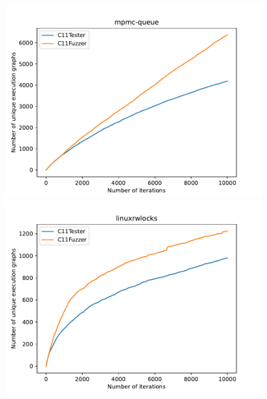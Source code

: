 \begin{figure}[H]
    \vspace{0.5cm}

    \begin{minipage}{0.45\textwidth}
        \centering
        \includegraphics[width=\textwidth]{figure/mpmc-queue.pdf}
    \end{minipage}
    \hfill
    \begin{minipage}{0.45\textwidth}
        \centering
        \includegraphics[width=\textwidth]{figure/linuxrwlocks.pdf}
    \end{minipage}

    \vspace{0.5cm}


\end{figure}
